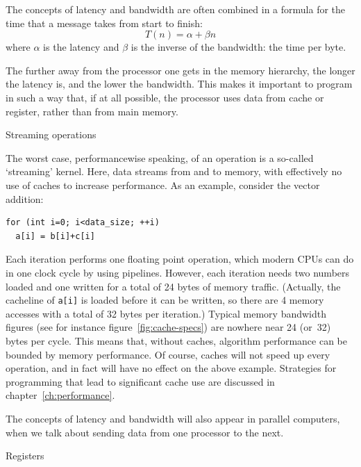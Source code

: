 The concepts of latency and bandwidth are often combined in a formula
for the time that a message takes from start to finish:
\[ T(n) = \alpha+\beta n \]
where $\alpha$ is the latency and $\beta$ is the inverse of the
bandwidth: the time per byte.

The further away from the processor one gets
in the memory hierarchy, the longer
the latency is, and the lower the bandwidth.
This makes it important to program in such a
way that, if at all possible,
the processor uses data from cache or register,
rather than from main memory. 

 {Streaming operations}

The worst case, performancewise speaking, of an operation
is a so-called `streaming' kernel.
Here, data streams from and to memory, with effectively no use of caches
to increase performance.
As an example, consider the vector addition:
\begin{lstlisting}
for (int i=0; i<data_size; ++i)
  a[i] = b[i]+c[i]
\end{lstlisting}
Each iteration performs one floating point operation, which modern
\acp{CPU} can do in one clock cycle by using pipelines.
However, each
iteration needs two numbers loaded and one written
for a total of 24 bytes of memory traffic.
(Actually, the cacheline of \lstinline{a[i]} is loaded before it can be written,
so there are 4 memory accesses with a total of 32 bytes per
iteration.)
Typical memory bandwidth figures (see
for instance figure~\ref{fig:cache-specs}) are nowhere near 24 (or~32) bytes per
cycle.
This means that, without caches, algorithm performance can be
bounded by memory performance. Of course, caches will not speed up
every operation, and in fact will have no effect on the above
example.
Strategies for programming that lead to significant cache use are discussed in chapter~\ref{ch:performance}.

The concepts of latency and bandwidth will also appear in parallel
computers, when we talk about sending data from one processor to the
next.

 {Registers}
\label{sec:register}

